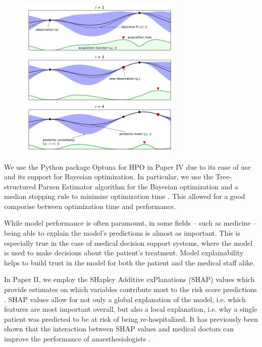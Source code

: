\begin{figure}[htbp]
    \centering
    \includegraphics[width=0.7\textwidth]{figures/MasterThesis-hpo-bayesian}
\end{figure}

We use the Python package Optuna \autocite{akibaOptunaNextgenerationHyperparameter2019} for HPO in Paper IV due to its ease of use and its support for Bayesian optimization. In particular, we use the Tree-structured Parzen Estimator algorithm for the Bayesian optimization and a median stopping rule to minimize optimization time \autocite{bergstraAlgorithmsHyperParameterOptimization2011}. This allowed for a good comporise between optimization time and performance.

While model performance is often paramount, in some fields -- such as medicine -- being able to explain the model's predictions is almost as important. This is especially true in the case of medical decision support systems, where the model is used to make decisions about the patient's treatment. Model explainability helps to build trust in the model for both the patient and the medical staff alike.

In Paper II, we employ the SHapley Additive exPlanations (SHAP) values which provide estimates on which variables contribute most to the risk score predictions \autocite{lundbergUnifiedApproachInterpreting2017,lundbergLocalExplanationsGlobal2020}. SHAP values allow for not only a global explanation of the model, i.e. which features are most important overall, but also a local explanation, i.e. why a single patient was predicted to be at risk of being re-hospitalized. It has previously been shown that the interaction between SHAP values and medical doctors can improve the performance of anaesthesiologists  \autocite{lundbergExplainableMachinelearningPredictions2018a}.

